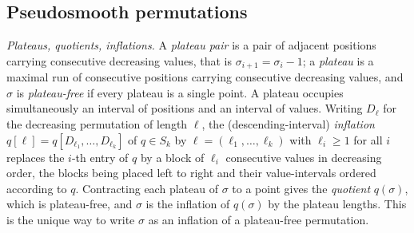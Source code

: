 \documentclass[12pt]{article}
\def\xspace{ }%
\theoremstyle{definition}
\newcommand{\Psm}{Pseudosmooth\xspace}
\begin{document}
\subsection{\Psm permutations}\label{ssec:PA}


\emph{Plateaus, quotients, inflations.} A \emph{plateau pair} is a pair
of adjacent positions carrying consecutive decreasing values, that is
$\sigma_{i+1} = \sigma_i - 1$; a \emph{plateau} is a maximal run of
consecutive positions carrying consecutive decreasing values, and
$\sigma$ is \emph{plateau-free} if every plateau is a single point. A
plateau occupies simultaneously an interval of positions and an interval
of values. Writing $D_\ell$ for the decreasing permutation of length
$\ell$, the (descending-interval) \emph{inflation}
$q[\ell] = q[D_{\ell_1},\dots,D_{\ell_k}]$ of $q \in S_k$ by
$\ell=(\ell_1,\dots,\ell_k)$ with $\ell_i \ge 1$ for all $i$ replaces the
$i$-th entry of $q$ by a block of $\ell_i$ consecutive values in
decreasing order, the blocks being placed left to right and their
value-intervals ordered according to $q$. Contracting each plateau of $\sigma$ to a
point gives the \emph{quotient} $q(\sigma)$, which is plateau-free,
and $\sigma$ is the inflation of $q(\sigma)$ by the plateau lengths.
This is the unique way to write $\sigma$ as an inflation of a plateau-free permutation.
\end{document}
